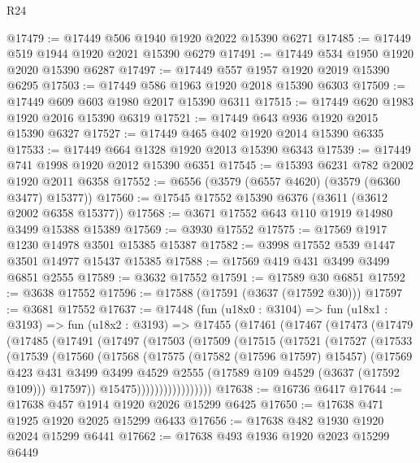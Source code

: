 \begin{lexlean}{R24}
\begin{coremodule}
@17479 := @17449 @506 @1940 @1920 @2022 @15390 @6271
@17485 := @17449 @519 @1944 @1920 @2021 @15390 @6279
@17491 := @17449 @534 @1950 @1920 @2020 @15390 @6287
@17497 := @17449 @557 @1957 @1920 @2019 @15390 @6295
@17503 := @17449 @586 @1963 @1920 @2018 @15390 @6303
@17509 := @17449 @609 @603 @1980 @2017 @15390 @6311
@17515 := @17449 @620 @1983 @1920 @2016 @15390 @6319
@17521 := @17449 @643 @936 @1920 @2015 @15390 @6327
@17527 := @17449 @465 @402 @1920 @2014 @15390 @6335
@17533 := @17449 @664 @1328 @1920 @2013 @15390 @6343
@17539 := @17449 @741 @1998 @1920 @2012 @15390 @6351
@17545 := @15393 @6231 @782 @2002 @1920 @2011 @6358
@17552 := @6556 (@3579 (@6557 @4620) (@3579 (@6360 @3477) @15377))
@17560 := @17545 @17552 @15390 @6376 (@3611 (@3612 @2002 @6358 @15377))
@17568 := @3671 @17552 @643 @110 @1919 @14980 @3499 @15388 @15389
@17569 := @3930 @17552
@17575 := @17569 @1917 @1230 @14978 @3501 @15385 @15387
@17582 := @3998 @17552 @539 @1447 @3501 @14977 @15437 @15385
@17588 := @17569 @419 @431 @3499 @3499 @6851 @2555
@17589 := @3632 @17552
@17591 := @17589 @30 @6851
@17592 := @3638 @17552
@17596 := @17588 (@17591 (@3637 (@17592 @30)))
@17597 := @3681 @17552
@17637 := @17448
    (fun (u18x0 : @3104) =>
    fun (u18x1 : @3193) =>
    fun (u18x2 : @3193) =>
    @17455
      (@17461
        (@17467
          (@17473
            (@17479
              (@17485
                (@17491
                  (@17497
                    (@17503
                      (@17509
                        (@17515
                          (@17521
                            (@17527
                              (@17533
                                (@17539
                                  (@17560
                                    (@17568
                                      (@17575
                                        (@17582 (@17596 @17597) @15457)
                                        (@17569
                                          @423
                                          @431
                                          @3499
                                          @3499
                                          @4529
                                          @2555
                                          (@17589 @109 @4529 (@3637 (@17592 @109)))
                                          @17597))
                                      @15475)))))))))))))))))
@17638 := @16736 @6417
@17644 := @17638 @457 @1914 @1920 @2026 @15299 @6425
@17650 := @17638 @471 @1925 @1920 @2025 @15299 @6433
@17656 := @17638 @482 @1930 @1920 @2024 @15299 @6441
@17662 := @17638 @493 @1936 @1920 @2023 @15299 @6449

\end{coremodule}
\end{lexlean}
